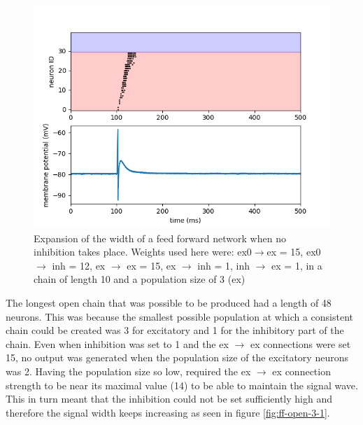 \documentclass[10pt,a4paper]{article}
\begin{document}
\begin{figure}
    \centering
    \includegraphics[width=\textwidth]{figures/feedforward-expansion.png}
    \caption{Expansion of the width of a feed forward network when no inhibition
        takes place. Weights used here were: ex0$\rightarrow$ex = 15, ex0 $\rightarrow$ inh = 12, ex $\rightarrow$ ex
        = 15, ex $\rightarrow$ inh = 1, inh $\rightarrow$ ex = 1, in a chain of length 10 and a population
        size of 3 (ex)}
    \label{fig:ff-expansion}
\end{figure}

The longest open chain that was possible to be produced had a length of 48
neurons. This was because the smallest possible population at which a
consistent chain could be created was 3 for excitatory and 1 for the inhibitory
part of the chain. Even when inhibition was set to 1 and the ex $\rightarrow$ ex
connections were set 15, no output was generated when the population size of the
excitatory neurons was 2. Having the population size so low, required the ex
$\rightarrow$ ex connection strength to be near its maximal value (14) to be
able to maintain the signal wave. This in turn meant that the inhibition could
not be set sufficiently high and therefore the signal width keeps increasing as
seen in figure \ref{fig:ff-open-3-1}.
\end{document}
